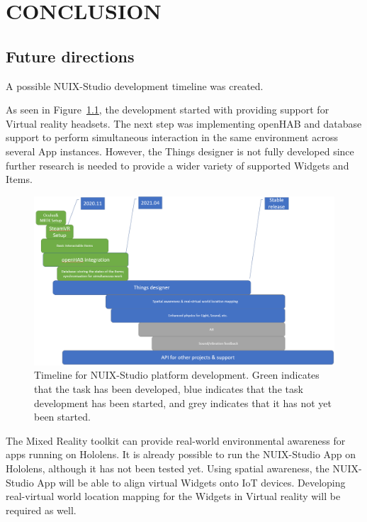 
\chapter{\MakeUppercase{Conclusion}}


\section{Future directions}

A possible NUIX-Studio development timeline was created.

As seen in Figure~\ref{fig:Timeline-figure}, the development started with providing support for Virtual reality headsets. The next step was implementing openHAB and database support to perform simultaneous interaction in the same environment across several App instances. However, the Things designer is not fully developed since further research is needed to provide a wider variety of supported Widgets and Items.

\begin{figure}
  \centering
  \includegraphics[width=0.9\linewidth]{figures/Timeline.png}
  \caption{Timeline for NUIX-Studio platform development. Green indicates that the task has been developed, blue indicates that the task development has been started, and grey indicates that it has not yet been started.}
  \label{fig:Timeline-figure}
\end{figure}

The Mixed Reality toolkit can provide real-world environmental awareness for apps running on Hololens. It is already possible to run the NUIX-Studio App on Hololens, although it has not been tested yet. Using spatial awareness, the NUIX-Studio App will be able to align virtual Widgets onto IoT devices. Developing real-virtual world location mapping for the Widgets in Virtual reality will be required as well.

